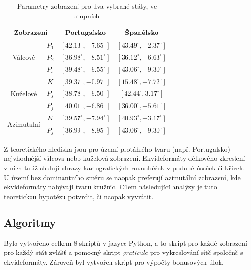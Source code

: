 \documentclass[12pt]{article}
\begin{document}
\begin{table}[h]
\centering
\caption{Parametry zobrazení pro dva vybrané státy, ve stupních}
\vspace{2mm}
\begin{tabular}{|c|c||c|c|}
\hline
\multicolumn{2}{|c||}{Zobrazení} & Portugalsko & Španělsko \\
\hline
\multirow{3}{*}{Válcové} & $P_1$ & $[42.13^\circ, -7.65^\circ]$ & $[43.49^\circ, -2.37^\circ]$ \\
                         & $P_2$ & $[36.98^\circ, -8.51^\circ]$ & $[36.12^\circ, -6.63^\circ]$ \\
                         & $P_s$ & $[39.48^\circ, -9.55^\circ]$ & $[43.06^\circ, -9.30^\circ]$ \\
\hline
\multirow{3}{*}{Kuželové}& $K$   & $[39.37^\circ, -0.97^\circ]$ & $[15.48^\circ, -7.72^\circ]$ \\
                         & $P_s$ & $[38.78^\circ, -9.50^\circ]$ & $[42.44^\circ, 3.17^\circ]$ \\
                         & $P_j$ & $[40.01^\circ, -6.86^\circ]$ & $[36.00^\circ, -5.61^\circ]$ \\
\hline
\multirow{2}{*}{Azimutální}& $K$ & $[39.57^\circ, -7.94^\circ]$ & $[40.93^\circ, -3.17^\circ]$ \\
                         & $P_j$ & $[36.99^\circ, -8.95^\circ]$ & $[43.06^\circ, -9.30^\circ]$ \\
\hline
\end{tabular}
\label{tab:parametry}
\end{table}

Z teoretického hlediska jsou pro území protáhlého tvaru (např. Portugalsko) nejvhodnější válcová nebo kuželová zobrazení. Ekvideformáty délkového zkreslení v nich totiž sledují obrazy kartografických rovnoběžek v podobě úseček či křivek. U území bez dominantního směru se naopak preferují azimutální zobrazení, kde ekvideformáty nabývají tvaru kružnic. Cílem následující analýzy je tuto teoretickou hypotézu potvrdit, či naopak vyvrátit.

\newpage
\subsection{Algoritmy}
Bylo vytvořeno celkem 8 skriptů v jazyce Python, a to skript pro každé zobrazení pro každý stát zvlášť a pomocný skript \textit{graticule} pro vykreslování sítě společně s ekvideformáty. Zároveň byl vytvořen skript pro výpočty bonusových úloh.
\end{document}
